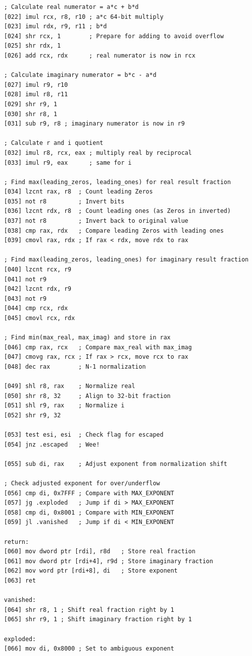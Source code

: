 \documentclass[12pt,letter]{article}
\begin{document}
\begin{lstlisting}[style=rust, caption={Full complex division assembly instructions including ambiguous handling}, label={fig:circle_divide}]
; Calculate real numerator = a*c + b*d
[022] imul rcx, r8, r10 ; a*c 64-bit multiply
[023] imul rdx, r9, r11 ; b*d
[024] shr rcx, 1        ; Prepare for adding to avoid overflow
[025] shr rdx, 1
[026] add rcx, rdx      ; real numerator is now in rcx

; Calculate imaginary numerator = b*c - a*d
[027] imul r9, r10
[028] imul r8, r11
[029] shr r9, 1
[030] shr r8, 1
[031] sub r9, r8 ; imaginary numerator is now in r9

; Calculate r and i quotient
[032] imul r8, rcx, eax ; multiply real by reciprocal
[033] imul r9, eax      ; same for i

; Find max(leading_zeros, leading_ones) for real result fraction
[034] lzcnt rax, r8  ; Count leading Zeros
[035] not r8         ; Invert bits
[036] lzcnt rdx, r8  ; Count leading ones (as Zeros in inverted)
[037] not r8         ; Invert back to original value
[038] cmp rax, rdx   ; Compare leading Zeros with leading ones
[039] cmovl rax, rdx ; If rax < rdx, move rdx to rax

; Find max(leading_zeros, leading_ones) for imaginary result fraction
[040] lzcnt rcx, r9
[041] not r9
[042] lzcnt rdx, r9
[043] not r9
[044] cmp rcx, rdx
[045] cmovl rcx, rdx

; Find min(max_real, max_imag) and store in rax
[046] cmp rax, rcx   ; Compare max_real with max_imag
[047] cmovg rax, rcx ; If rax > rcx, move rcx to rax
[048] dec rax        ; N-1 normalization

[049] shl r8, rax    ; Normalize real
[050] shr r8, 32     ; Align to 32-bit fraction
[051] shl r9, rax    ; Normalize i
[052] shr r9, 32

[053] test esi, esi  ; Check flag for escaped
[054] jnz .escaped   ; Wee!

[055] sub di, rax    ; Adjust exponent from normalization shift

; Check adjusted exponent for over/underflow
[056] cmp di, 0x7FFF ; Compare with MAX_EXPONENT
[057] jg .exploded   ; Jump if di > MAX_EXPONENT
[058] cmp di, 0x8001 ; Compare with MIN_EXPONENT
[059] jl .vanished   ; Jump if di < MIN_EXPONENT

return:
[060] mov dword ptr [rdi], r8d   ; Store real fraction
[061] mov dword ptr [rdi+4], r9d ; Store imaginary fraction
[062] mov word ptr [rdi+8], di   ; Store exponent
[063] ret

vanished:
[064] shr r8, 1 ; Shift real fraction right by 1
[065] shr r9, 1 ; Shift imaginary fraction right by 1

exploded:
[066] mov di, 0x8000 ; Set to ambiguous exponent


\end{lstlisting}
\end{document}
